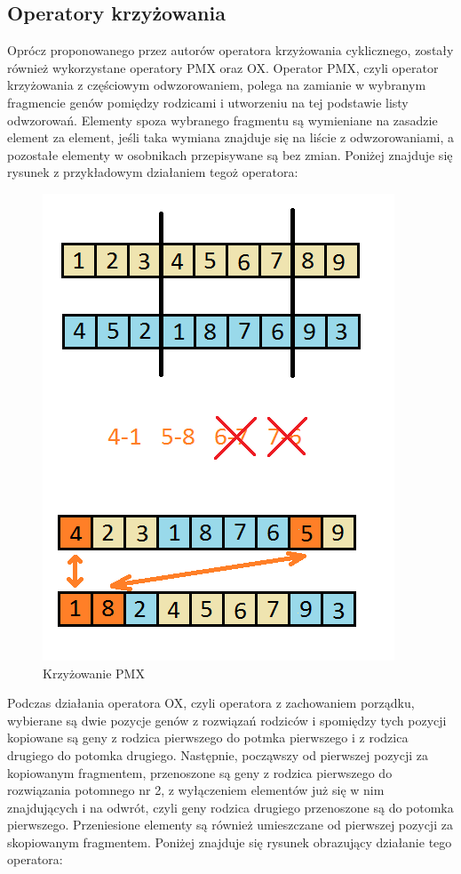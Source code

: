 \subsection{Operatory krzyżowania}
Oprócz proponowanego przez autorów operatora krzyżowania cyklicznego, zostały również wykorzystane operatory PMX oraz OX.
Operator PMX, czyli operator krzyżowania z częściowym odwzorowaniem, polega na zamianie w wybranym fragmencie genów pomiędzy rodzicami i utworzeniu na tej podstawie listy odwzorowań. Elementy spoza wybranego fragmentu są wymieniane na zasadzie element za element, jeśli taka wymiana znajduje się na liście z odwzorowaniami, a pozostałe elementy w osobnikach przepisywane są bez zmian. Poniżej znajduje się rysunek z przykładowym działaniem tegoż operatora:
\newpage
\begin{figure}[t]
\includegraphics[scale=1]{pmx}
\caption{Krzyżowanie PMX}
\end{figure}

Podczas działania operatora OX, czyli operatora z zachowaniem porządku, wybierane są dwie pozycje genów z rozwiązań rodziców i spomiędzy tych pozycji kopiowane są geny z rodzica pierwszego do potmka pierwszego i z rodzica drugiego do potomka drugiego. Następnie, począwszy od pierwszej pozycji za kopiowanym fragmentem, przenoszone są geny z rodzica pierwszego do rozwiązania potomnego nr 2, z wyłączeniem elementów już się w nim znajdujących i na odwrót, czyli geny rodzica drugiego przenoszone są do potomka pierwszego. Przeniesione elementy są również umieszczane od pierwszej pozycji za skopiowanym fragmentem. Poniżej znajduje się rysunek obrazujący działanie tego operatora:

